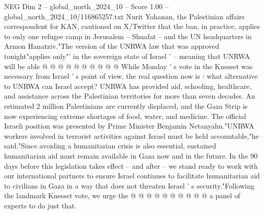 \begin{textsample}{NEG Dim 2 – global\_north\_2024\_10 – Score 1.00 – global\_north\_2024\_10/116865257.txt}
Nurit Yohanan, the Palestinian affairs correspondent for KAN, cautioned on X/Twitter that the ban, in practice, applies to only one refugee camp in Jerusalem -- Shuafat -- and the UN headquarters in Armon Hanatziv."The version of the UNRWA law that was approved tonight"applies only"' in the sovereign state of Israel ' -- meaning that UNRWA will be able @ @ @ @ @ @ @ @ @ @ While Monday ' s vote in the Knesset was necessary from Israel ' s point of view, the real question now is : what alternative to UNRWA can Israel accept?
UNRWA has provided aid, schooling, healthcare, and assistance across the Palestinian territories for more than seven decades.
An estimated 2 million Palestinians are currently displaced, and the Gaza Strip is now experiencing extreme shortages of food, water, and medicine.
The official Israeli position was presented by Prime Minister Benjamin Netanyahu."UNRWA workers involved in terrorist activities against Israel must be held accountable,"he said."Since avoiding a humanitarian crisis is also essential, sustained humanitarian aid must remain available in Gaza now and in the future.
In the 90 days before this legislation takes effect -- and after -- we stand ready to work with our international partners to ensure Israel continues to facilitate humanitarian aid to civilians in Gaza in a way that does not threaten Israel ' s security."Following the landmark Knesset vote, we urge the @ @ @ @ @ @ @ @ @ @ a panel of experts to do just that.

\end{textsample}
